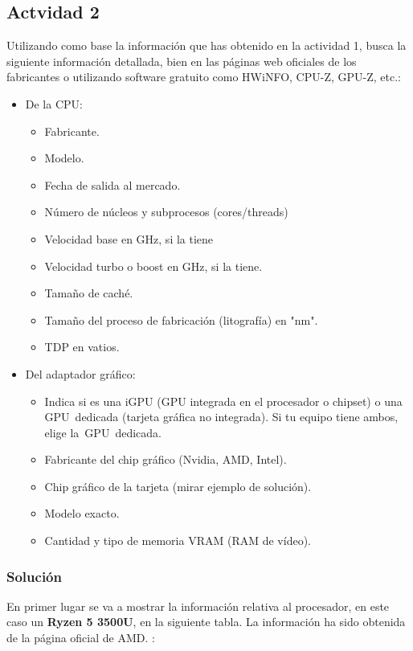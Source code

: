 \subsection{Actvidad 2}
Utilizando como base la información que has obtenido en la actividad 1, busca la siguiente información detallada, bien en las páginas web oficiales de los fabricantes o utilizando software gratuito como HWiNFO, CPU-Z, GPU-Z, etc.:

\begin{itemize}
    \item De la CPU:
    \begin{itemize}
        \item Fabricante.
        \item Modelo.
        \item Fecha de salida al mercado.
        \item Número de núcleos y subprocesos (cores/threads)
        \item Velocidad base en GHz, si la tiene
        \item Velocidad turbo o boost en GHz, si la tiene.
        \item Tamaño de caché.
        \item Tamaño del proceso de fabricación (litografía) en "nm".
        \item  TDP en vatios.
    \end{itemize}
    \item Del adaptador gráfico:
    \begin{itemize}
        \item Indica si es una iGPU (GPU integrada en el procesador o chipset) o una GPU dedicada (tarjeta gráfica no integrada). Si tu equipo tiene ambos, elige la GPU dedicada.
        \item Fabricante del chip gráfico (Nvidia, AMD, Intel).
        \item Chip gráfico de la tarjeta (mirar ejemplo de solución).
        \item Modelo exacto.
        \item Cantidad y tipo de memoria VRAM (RAM de vídeo).
    \end{itemize}
\end{itemize}

\subsubsection{Solución}

En primer lugar se va a mostrar la información relativa al procesador, en este caso un \textbf{Ryzen 5 3500U}, en la siguiente tabla. La información ha sido obtenida de la página oficial de AMD. \cite{amd01}:

